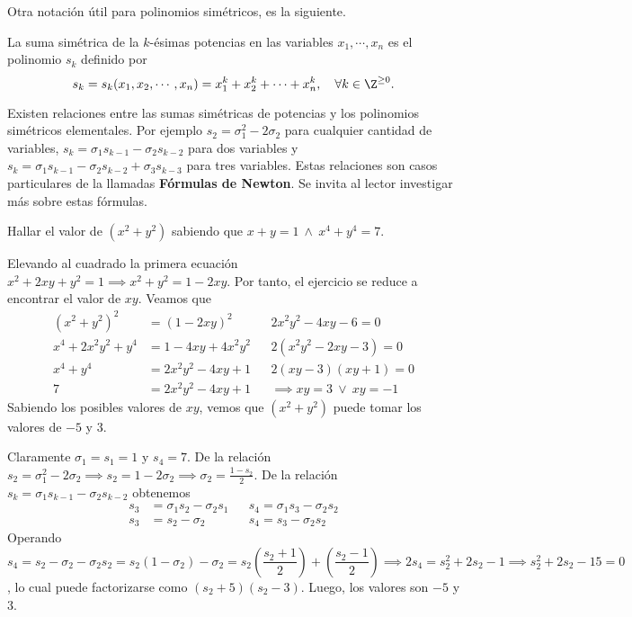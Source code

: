 Otra notación útil para polinomios simétricos, es la siguiente.

\begin{definition}
    La suma simétrica de la $k$-ésimas potencias en las variables $x_1, \cdots, x_n$ es el polinomio $s_k$ definido por
    \[s_k = s_k(x_1, x_2, \cdots, x_n) = x_1^k + x_2^k + \cdots + x_n^k, \quad \forall k \in \Z^{\geq 0}.\]
\end{definition}

Existen relaciones entre las sumas simétricas de potencias y los polinomios simétricos elementales.
Por ejemplo $s_2 = \sigma_1^2 - 2\sigma_2$ para cualquier cantidad de variables, $s_k = \sigma_1 s_{k - 1} - \sigma_2 s_{k - 2}$ para dos variables y $s_k = \sigma_1 s_{k - 1} - \sigma_2 s_{k - 2} + \sigma_3 s_{k - 3}$ para tres variables.
Estas relaciones son casos particulares de la llamadas \textbf{Fórmulas de Newton}.
Se invita al lector investigar más sobre estas fórmulas.

\begin{example}
    Hallar el valor de $(x^2 + y^2)$ sabiendo que $x + y = 1\ \land\ x^4 + y^4 = 7$.
\end{example}
\begin{solution}[1]
    Elevando al cuadrado la primera ecuación $x^2 + 2xy + y^2 = 1 \implies x^2 + y^2 = 1 - 2xy$.
    Por tanto, el ejercicio se reduce a encontrar el valor de $xy$.
    Veamos que
    \begin{align*}
    (x^2 + y^2)
        ^2 &= (1 - 2xy)^2 && 2x^2 y^2 - 4xy - 6 = 0\\
        x^4 + 2x^2 y^2 + y^4 &= 1 - 4xy + 4x^2 y^2 && 2(x^2 y^2 - 2xy - 3) = 0\\
        x^4 + y^4 &= 2x^2 y^2 - 4xy + 1 && 2(xy - 3)(xy + 1) = 0\\
        7 &= 2x^2 y^2 - 4xy + 1 && \implies xy = 3\ \lor \ xy = -1
    \end{align*}
    Sabiendo los posibles valores de $xy$, vemos que $(x^2 + y^2)$ puede tomar los valores de $-5$ y 3.
\end{solution}

\begin{solution}[2]
    Claramente $\sigma_1 = s_1 = 1$ y $s_4 = 7$.
    De la relación $s_2 = \sigma_1^2 - 2\sigma_2 \implies s_2 = 1 - 2\sigma_2 \implies \sigma_2 = \frac{1 - s_2}{2}$.
    De la relación $s_k = \sigma_1 s_{k - 1} - \sigma_2 s_{k - 2}$ obtenemos
    \begin{align*}
        s_3 &= \sigma_1 s_2 - \sigma_2 s_1 && s_4 = \sigma_1 s_3 - \sigma_2 s_2\\
        s_3 &= s_2 - \sigma_2 && s_4 = s_3 - \sigma_2 s_2
    \end{align*}
    Operando $s_4 = s_2 - \sigma_2 - \sigma_2 s_2 = s_2 (1 - \sigma_2) - \sigma_2 = s_2\left(\dfrac{s_2 + 1}{2}\right) + \left(\dfrac{s_2 - 1}{2}\right) \implies 2s_4 = s_2^2 + 2s_2 - 1 \implies s_2^2 + 2s_2 - 15 = 0$, lo cual puede factorizarse como $(s_2 + 5)(s_2 - 3)$.
    Luego, los valores son $-5$ y 3.
\end{solution}

